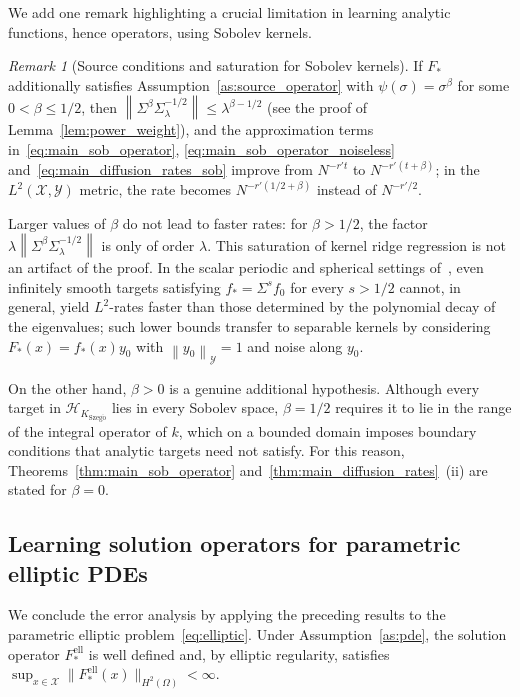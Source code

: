 \documentclass[11pt]{article}
\numberwithin{equation}{section}
\theoremstyle{plain}
\theoremstyle{definition}
\theoremstyle{remark}
\newtheorem{remark}[theorem]{Remark}
\newcommand{\X}{\mathcal{X}}
\newcommand{\Hs}{\mathcal{H}}
\newcommand{\Y}{\mathcal{Y}}
\newcommand{\norm}[1]{\left\lVert#1\right\rVert}
\newcommand{\Fell}{F_{*}^{\mathrm{ell}}}
\begin{document}
We add one remark highlighting a crucial limitation in learning analytic functions, hence operators,
using Sobolev kernels.
\begin{remark}[Source conditions and saturation for Sobolev kernels]
\label{rem:sobolev_saturation}
If $F_*$ additionally satisfies Assumption~\ref{as:source_operator} with
$\psi(\sigma)=\sigma^\beta$ for some $0<\beta\leq1/2$, then
$\norm{\Sigma^\beta\Sigma_\lambda^{-1/2}}\leq\lambda^{\beta-1/2}$ (see the
proof of Lemma~\ref{lem:power_weight}), and the approximation terms
in~\eqref{eq:main_sob_operator}, \eqref{eq:main_sob_operator_noiseless}
and~\eqref{eq:main_diffusion_rates_sob} improve from $N^{-r't}$ to
$N^{-r'(t+\beta)}$; in the $L^2(\X,\Y)$ metric, the rate becomes
$N^{-r'(1/2+\beta)}$ instead of $N^{-r'/2}$.

Larger values of $\beta$ do not lead to faster rates: for $\beta>1/2$, the
factor $\lambda\norm{\Sigma^\beta\Sigma_\lambda^{-1/2}}$ is only of order
$\lambda$. This saturation of kernel ridge regression is not an artifact of
the proof. In the scalar periodic and spherical settings
of~\cite[Theorem~5.2]{long2024duality}, even infinitely smooth targets
satisfying $f_*=\Sigma^sf_0$ for every $s>1/2$ cannot, in general, yield
$L^2$-rates faster than those determined by the polynomial decay of the
eigenvalues; such lower bounds transfer to separable kernels by considering
$F_*(x)=f_*(x)y_0$ with $\norm{y_0}_{\Y}=1$ and noise along $y_0$.

On the other hand, $\beta>0$ is a genuine additional hypothesis. Although
every target in $\Hs_{K_{\mathrm{Szeg\ddot{o}}}}$ lies in every Sobolev space,
$\beta=1/2$ requires it to lie in the range of the integral operator of $k$,
which on a bounded domain imposes boundary conditions that analytic targets
need not satisfy. For this reason, Theorems~\ref{thm:main_sob_operator}
and~\ref{thm:main_diffusion_rates}~(ii) are stated for $\beta=0$.
\end{remark}

\subsection{Learning solution operators for parametric elliptic PDEs}
\label{sec:pde}

We conclude the error analysis by applying the preceding results to the
parametric elliptic problem~\eqref{eq:elliptic}. Under
Assumption~\ref{as:pde}, the solution operator $\Fell$ is well defined and,
by elliptic regularity, satisfies
$\sup_{x\in\X}\|\Fell(x)\|_{H^2(\Omega)}<\infty$.
\end{document}
